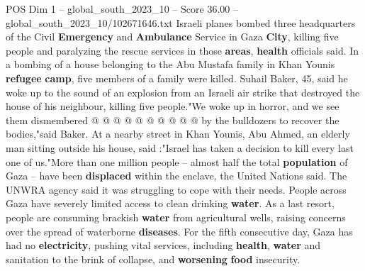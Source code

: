 \begin{textsample}{POS Dim 1 – global\_south\_2023\_10 – Score 36.00 – global\_south\_2023\_10/102671646.txt}
Israeli planes bombed three headquarters of the Civil \textbf{Emergency} and \textbf{Ambulance} Service in Gaza \textbf{City}, killing five people and paralyzing the rescue services in those \textbf{areas}, \textbf{health} officials said.
In a bombing of a house belonging to the Abu Mustafa family in Khan Younis \textbf{refugee} \textbf{camp}, five members of a family were killed.
Suhail Baker, 45, said he woke up to the sound of an explosion from an Israeli air strike that destroyed the house of his neighbour, killing five people."We woke up in horror, and we see them dismembered @ @ @ @ @ @ @ @ @ @ by the bulldozers to recover the bodies,"said Baker.
At a nearby street in Khan Younis, Abu Ahmed, an elderly man sitting outside his house, said :"Israel has taken a decision to kill every last one of us."More than one million people -- almost half the total \textbf{population} of Gaza -- have been \textbf{displaced} within the enclave, the United Nations said.
The UNWRA agency said it was struggling to cope with their needs.
People across Gaza have severely limited access to clean drinking \textbf{water}.
As a last resort, people are consuming brackish \textbf{water} from agricultural wells, raising concerns over the spread of waterborne \textbf{diseases}.
For the fifth consecutive day, Gaza has had no \textbf{electricity}, pushing vital services, including \textbf{health}, \textbf{water} and sanitation to the brink of collapse, and \textbf{worsening} \textbf{food} insecurity.

\end{textsample}
